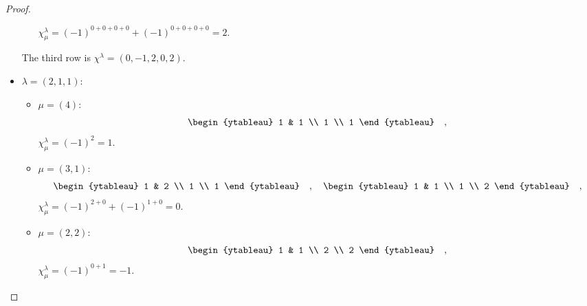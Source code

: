 \documentclass[8pt]{extarticle}
\newcommand{\<}{\langle}
\renewcommand{\>}{\rangle}
\theoremstyle{definition}
\begin{document}
\begin{proof}
\begin{itemize}
\begin{itemize}
      $\chi_{\mu}^{\lambda} = (-1)^{0 + 0 + 0 + 0} + (-1)^{0 + 0 + 0 + 0} = 2$.      
    \end{itemize}
    The third row is $\chi^\lambda = (0,-1,2,0,2)$.

  \item
    $\lambda = (2,1,1)$:
    
    \begin{itemize}
      
    \item
      $\mu = (4)$:
      \begin{align*}
        \begin{ytableau}
          1 & 1 \\
          1 \\
          1
        \end{ytableau}\quad,
      \end{align*}
      $\chi_{\mu}^{\lambda} = (-1)^{2} = 1$.

    \item
      $\mu = (3,1)$:
      \begin{align*}
        \begin{ytableau}
          1 & 2 \\
          1 \\
          1
        \end{ytableau}\quad,\quad
        \begin{ytableau}
          1 & 1 \\
          1 \\
          2
        \end{ytableau}\quad,        
      \end{align*}
      $\chi_{\mu}^{\lambda} = (-1)^{2+0} + (-1)^{1+0} = 0$.

    \item
      $\mu = (2,2)$:
      \begin{align*}
        \begin{ytableau}
          1 & 1 \\
          2 \\
          2
        \end{ytableau}\quad,        
      \end{align*}
      $\chi_{\mu}^{\lambda} = (-1)^{0+1}= -1$.


\end{itemize}
\end{itemize}
\end{proof}
\end{document}
